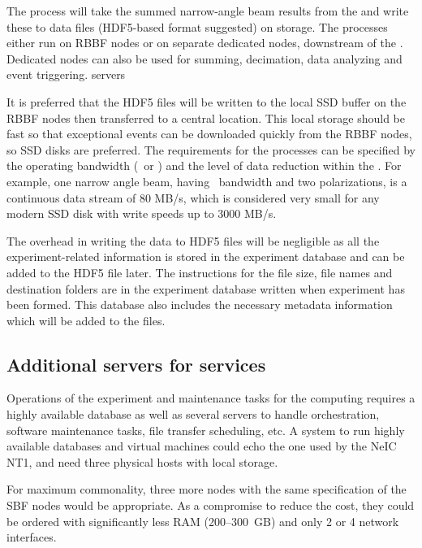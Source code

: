 \documentclass[12pt,a4paper]{article}
\begin{document}
The \FW process will take the summed narrow-angle beam results from the \SBF and write these to data files
(HDF5-based format suggested) on storage. 
The \FW processes either run on RBBF nodes or on separate dedicated nodes, downstream of the \SBF. 
Dedicated nodes can also be used for summing, decimation, data analyzing and event triggering. 
servers

It is preferred that the HDF5 files will be written to the local SSD buffer on the RBBF nodes then transferred to a central location. 
This local storage should be fast so that exceptional events can be downloaded quickly from the RBBF nodes, so SSD disks are preferred.
The requirements for the \FW processes can be specified by the operating bandwidth (\NBW\ or \WBW) and the level of data reduction within the \SBF. 
For example, one narrow angle beam, having \NBW\ bandwidth and two polarizations, is a continuous data stream of 80 MB/s, which is considered very small for any modern SSD disk with write speeds up to 3000 MB/s.  

The overhead in writing the data to HDF5 files will be negligible as all the experiment-related information is stored in the experiment database and can be added to the HDF5 file later. 
The instructions for the file size, file names and destination folders are in the experiment database written when experiment has been formed. 
This database also includes the necessary metadata information which will be added to the files.

\subsection{Additional servers for services}
\label{ssec:additional}

Operations of the experiment and maintenance tasks for the computing requires a highly available database as well as several servers to handle orchestration, software maintenance tasks, file transfer scheduling, etc. %
A system to run highly available databases and virtual machines could echo the one used by the NeIC NT1, and need three physical hosts with local storage.

For maximum commonality, three more nodes with the same specification of the SBF nodes would be appropriate.
As a compromise to reduce the cost, they could be ordered with significantly less RAM (200--300~GB) and only 2 or 4 network interfaces.
\end{document}
